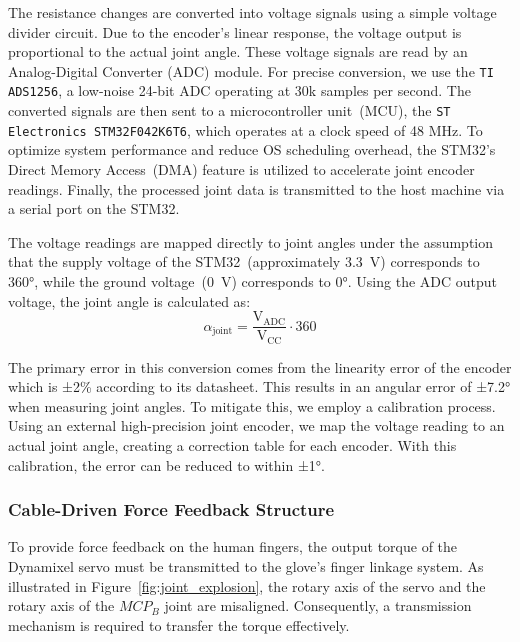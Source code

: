 The resistance changes are converted into voltage signals using a simple voltage divider circuit. Due to the encoder's linear response, the voltage output is proportional to the actual joint angle. These voltage signals are read by an Analog-Digital Converter (ADC) module. For precise conversion, we use the \texttt{TI ADS1256}, a low-noise 24-bit ADC operating at 30k samples per second. The converted signals are then sent to a microcontroller unit~(MCU), the \texttt{ST Electronics STM32F042K6T6}, which operates at a clock speed of 48 MHz. To optimize system performance and reduce OS scheduling overhead, the STM32's Direct Memory Access~(DMA) feature is utilized to accelerate joint encoder readings. Finally, the processed joint data is transmitted to the host machine via a serial port on the STM32.

The voltage readings are mapped directly to joint angles under the assumption that the supply voltage of the STM32~(approximately 3.3~V) corresponds to 360°, while the ground voltage~(0~V) corresponds to 0°. Using the ADC output voltage, the joint angle is calculated as:
\begin{equation}
    \alpha_{\text{joint}} = \frac{\text{V}_{\text{ADC}}}{\text{V}_{\text{CC}}} \cdot 360
    \label{eq:joint_angle}
\end{equation}

The primary error in this conversion comes from the linearity error of the encoder which is ±2\% according to its datasheet. This results in an angular error of ±7.2° when measuring joint angles. To mitigate this, we employ a calibration process. Using an external high-precision joint encoder, we map the voltage reading to an actual joint angle, creating a correction table for each encoder. With this calibration, the error can be reduced to within ±1°.

\vspace{2mm}
\subsubsection{\textbf{Cable-Driven Force Feedback Structure}}
\leavevmode

To provide force feedback on the human fingers, the output torque of the Dynamixel servo must be transmitted to the glove's finger linkage system. As illustrated in Figure~\ref{fig:joint_explosion}, the rotary axis of the servo and the rotary axis of the $MCP_B$ joint are misaligned. Consequently, a transmission mechanism is required to transfer the torque effectively.

